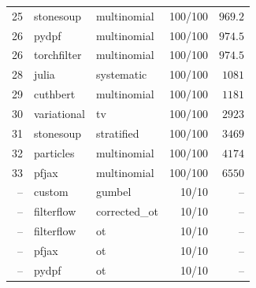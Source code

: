 \begin{table}[!htbp]
\begin{tabular}{rllrr}
25 & stonesoup & multinomial & 100/100 & $969.2$ \\
26 & pydpf & multinomial & 100/100 & $974.5$ \\
26 & torchfilter & multinomial & 100/100 & $974.5$ \\
28 & julia & systematic & 100/100 & $1081$ \\
29 & cuthbert & multinomial & 100/100 & $1181$ \\
30 & variational & tv & 100/100 & $2923$ \\
31 & stonesoup & stratified & 100/100 & $3469$ \\
32 & particles & multinomial & 100/100 & $4174$ \\
33 & pfjax & multinomial & 100/100 & $6550$ \\
-- & custom & gumbel & 10/10 & $\text{--}$ \\
-- & filterflow & corrected\_ot & 10/10 & $\text{--}$ \\
-- & filterflow & ot & 10/10 & $\text{--}$ \\
-- & pfjax & ot & 10/10 & $\text{--}$ \\
-- & pydpf & ot & 10/10 & $\text{--}$ \\
\bottomrule
\end{tabular}
\end{table}


